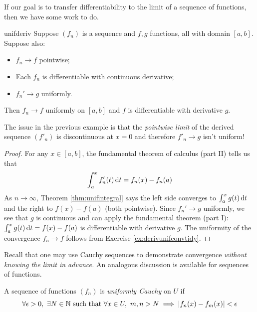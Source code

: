 \goodbreak


If our goal is to transfer differentiability to the limit of a sequence of functions, then we have some work to do.

\begin{thm}{}{unifderiv}
	Suppose $(f_n)$ is a sequence and $f,g$ functions, all with domain $[a,b]$. Suppose also:
	\begin{itemize}
	  \item $f_n\to f$ pointwise;
	  \item Each $f_n$ is differentiable with continuous derivative;\footnotemark
	  \item $f_n'\to g$ uniformly.
	\end{itemize}
	Then $f_n\to f$ uniformly on $[a,b]$ and $f$ is differentiable with derivative $g$.
\end{thm}


The issue in the previous example is that the \emph{pointwise limit} of the derived sequence $(f'_n)$ is discontinuous at $x=0$ and therefore $f'_n\to g$ isn't uniform! 

\begin{proof}
	For any $x\in [a,b]$, the fundamental theorem of calculus (part II) tells us that
	\[
		\int_a^x f'_n(t)\,{\mathrm{d} t}  = f_n(x)-f_n(a)
	\]
	As $n\to\infty$, Theorem \ref{thm:unifintegral} says the left side converges to $\int_a^x g(t)\,{\mathrm{d} t}$ and the right to $f(x)-f(a)$ (both pointwise). Since $f_n'\to g$ uniformly, we see that $g$ is continuous and can apply the fundamental theorem (part I): $\int_a^xg(t)\,{\mathrm{d} t}=f(x)-f(a)$ is differentiable with derivative $g$.\smallbreak
	The uniformity of the convergence $f_n\to f$ follows from Exercise \ref{ex:derivunifconvtidy}.
\end{proof}



Recall that one may use Cauchy sequences to demonstrate convergence \emph{without knowing the limit in advance.} An analogous discussion is available for sequences of functions.


\begin{defn}{}{}
	A sequence of functions $(f_n)$ is \emph{uniformly Cauchy} on $U$ if
	\[
		\forall\epsilon>0,\ \exists N\in\N \text{ such that }\forall x\in U,\ m,n>N\implies\nm{f_n(x)-f_m(x)}<\epsilon
	\]
\end{defn}

